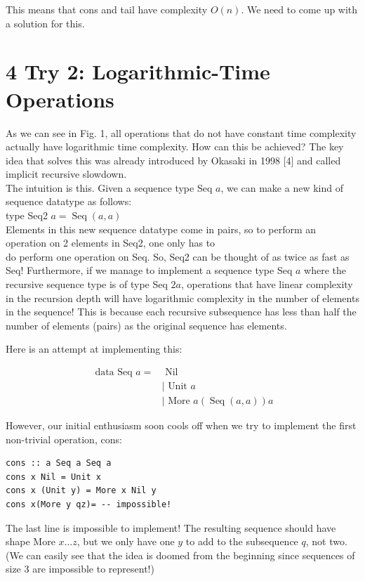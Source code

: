 \documentclass[10pt]{article}
\begin{document}
This means that cons and tail have complexity $O(n)$. We need to come up with a solution for this.

\section*{4 Try 2: Logarithmic-Time Operations}
As we can see in Fig. 1, all operations that do not have constant time complexity actually have logarithmic time complexity. How can this be achieved? The key idea that solves this was already introduced by Okasaki in 1998 [4] and called implicit recursive slowdown.\\
The intuition is this. Given a sequence type Seq $a$, we can make a new kind of sequence datatype as follows:\\
type Seq2 $a=\operatorname{Seq}(a, a)$\\
Elements in this new sequence datatype come in pairs, so to perform an operation on 2 elements in Seq2, one only has to\\
do perform one operation on Seq. So, Seq2 can be thought of as twice as fast as Seq! Furthermore, if we manage to implement a sequence type Seq $a$ where the recursive sequence type is of type Seq $2 a$, operations that have linear complexity in the recursion depth will have logarithmic complexity in the number of elements in the sequence! This is because each recursive subsequence has less than half the number of elements (pairs) as the original sequence has elements.

Here is an attempt at implementing this:

$$
\begin{aligned}
\text { data Seq } a= & \text { Nil } \\
& \mid \text { Unit } a \\
& \mid \text { More } a(\operatorname{Seq}(a, a)) a
\end{aligned}
$$

However, our initial enthusiasm soon cools off when we try to implement the first non-trivial operation, cons:

\begin{verbatim}
cons :: a Seq a Seq a
cons x Nil = Unit x
cons x (Unit y) = More x Nil y
cons x(More y qz)= -- impossible!
\end{verbatim}

The last line is impossible to implement! The resulting sequence should have shape More $x \ldots z$, but we only have one $y$ to add to the subsequence $q$, not two. (We can easily see that the idea is doomed from the beginning since sequences of size 3 are impossible to represent!)
\end{document}
